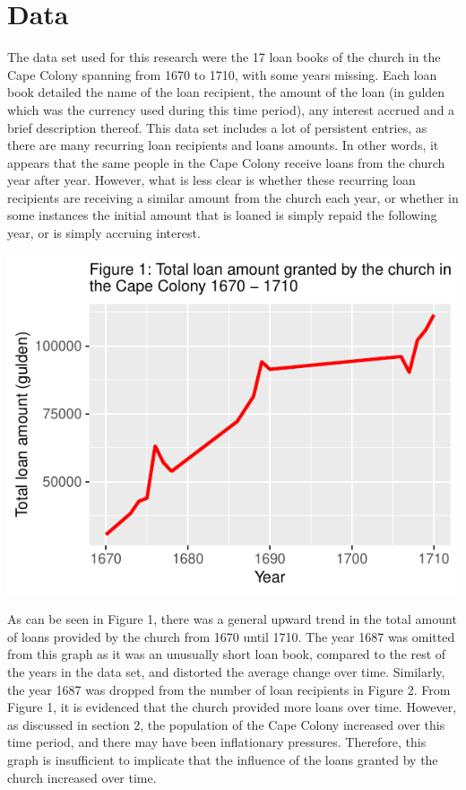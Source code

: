 \documentclass[11pt,preprint, authoryear]{elsarticle}
\numberwithin{equation}{section}
\numberwithin{figure}{section}
\numberwithin{table}{section}
\begin{document}
\hypertarget{data}{%
\section{\texorpdfstring{Data \label{Data}}{Data }}\label{data}}

The data set used for this research were the 17 loan books of the church
in the Cape Colony spanning from 1670 to 1710, with some years missing.
Each loan book detailed the name of the loan recipient, the amount of
the loan (in gulden which was the currency used during this time
period), any interest accrued and a brief description thereof. This data
set includes a lot of persistent entries, as there are many recurring
loan recipients and loans amounts. In other words, it appears that the
same people in the Cape Colony receive loans from the church year after
year. However, what is less clear is whether these recurring loan
recipients are receiving a similar amount from the church each year, or
whether in some instances the initial amount that is loaned is simply
repaid the following year, or is simply accruing interest.

\begin{center}\includegraphics{HistoryEssay_files/figure-latex/unnamed-chunk-1-1} \end{center}

As can be seen in Figure 1, there was a general upward trend in the
total amount of loans provided by the church from 1670 until 1710. The
year 1687 was omitted from this graph as it was an unusually short loan
book, compared to the rest of the years in the data set, and distorted
the average change over time. Similarly, the year 1687 was dropped from
the number of loan recipients in Figure 2. From Figure 1, it is
evidenced that the church provided more loans over time. However, as
discussed in section 2, the population of the Cape Colony increased over
this time period, and there may have been inflationary pressures.
Therefore, this graph is insufficient to implicate that the influence of
the loans granted by the church increased over time.
\end{document}
